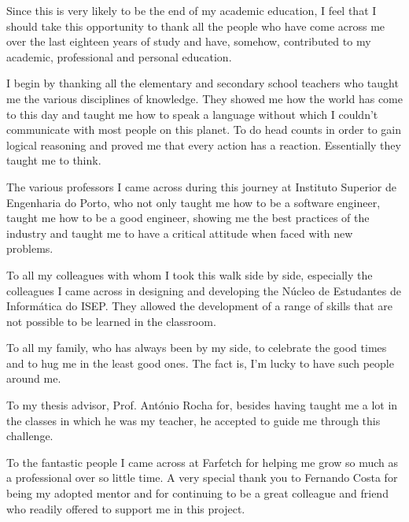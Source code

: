 
\begin{acknowledgements}
Since this is very likely to be the end of my academic education, I feel that I should take this opportunity to thank all the people who have come across me over the last eighteen years of study and have, somehow, contributed to my academic, professional and personal education.
\par
I begin by thanking all the elementary and secondary school teachers who taught me the various disciplines of knowledge. They showed me how the world has come to this day and taught me how to speak a language without which I couldn't communicate with most people on this planet. To do head counts in order to gain logical reasoning and proved me that every action has a reaction. Essentially they taught me to think.

\par

The various professors I came across during this journey at Instituto Superior de Engenharia do Porto, who not only taught me how to be a software engineer, taught me how to be a good engineer, showing me the best practices of the industry and taught me to have a critical attitude when faced with new problems.

\par

To all my colleagues with whom I took this walk side by side, especially the colleagues I came across in designing and developing the Núcleo de Estudantes de Informática do ISEP. They allowed the development of a range of skills that are not possible to be learned in the classroom.

\par

To all my family, who has always been by my side, to celebrate the good times and to hug me in the least good ones. The fact is, I'm lucky to have such people around me.

\par
To my thesis advisor, Prof. António Rocha for, besides having taught me a lot in the classes in which he was my teacher, he accepted to guide me through this challenge.

\par

To the fantastic people I came across at Farfetch for helping me grow so much as a professional over so little time. A very special thank you to Fernando Costa for being my adopted mentor and for continuing to be a great colleague and friend who readily offered to support me in this project.


\end{acknowledgements}
